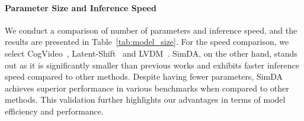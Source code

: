 \begin{table*}[t]
\caption{Quantitative comparison with evaluated baseline~\cite{tuneavideo}. The ``Training'' refers to the process of optimization, and ``Memory'' refers to the GPU memory.}
\vspace{-2mm}
\centering
\setlength\tabcolsep{0.3pt}
\small
{}
\label{tab:tuneavideo}
\vspace{-2mm}
\end{table*}

\paragraph{Parameter Size and Inference Speed}
We conduct a comparison of number of parameters and inference speed, and the results are presented in Table~\ref{tab:model_size}. For the speed comparison, we select CogVideo~\cite{hong2022cogvideo}, Latent-Shift~\cite{latentshift} and LVDM~\cite{lvdm}.
SimDA, on the other hand, stands out as it is significantly smaller than previous works and exhibits faster inference speed compared to other methods. Despite having fewer parameters, SimDA achieves superior performance in various benchmarks when compared to other methods. This validation further highlights our advantages in terms of model efficiency and performance.

